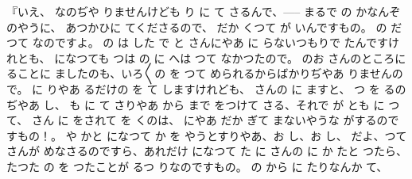 『いえ、
なのぢや
りませんけども
り
に
て
さるんで、\------ まるで
の
かなんぞのやうに、
あつかひに
てくださるので、
だか
くつて
が
いんですもの。
の
だつて
なのですよ。
の
は
した
で
と
さんにやあ
に
らないつもりで
たんですけれとも、
になつても
つは
の
に
へは
つて
なかつたので。
のお
さんのところに
ることに
ましたのも、いろ〳〵の
を
つて
められるからばかりぢやあ
りませんので。
に
りやあ
るだけの
を
て
しますけれども、
さんの
に
ますと、
つ
を
るのぢやあ
し、
も
に
て
さりやあ
から
まで
をつけて
さる、それで
が
とも
に
つて、
さん
に
をされて
を
くのは、
にやあ
だか
ぎて
まないやうな
がするのですもの！。
や
かと
になつて
か
を
やうとすりやあ、お
し、お
し、
だよ、つて
さんが
めなさるのですら、あれだけ
になつて
た
に
さんの
に
か
たと
つたら、たつた
の
を
つたことが
るつ
りなのですもの。
の
から
に
たりなんか
て、
